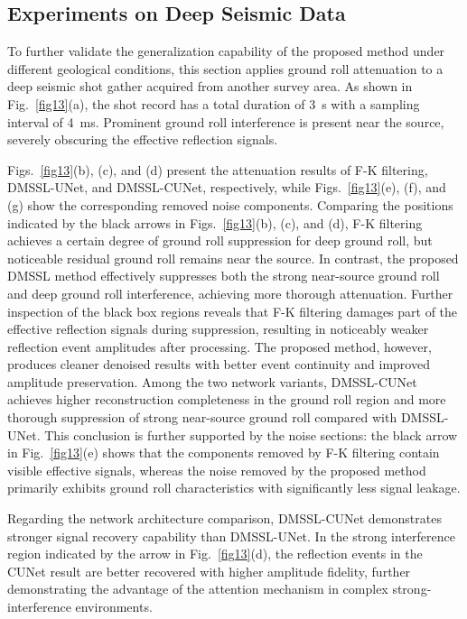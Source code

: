 \documentclass[a4paper,fleqn]{cas-dc}
\begin{document}
\subsection{Experiments on Deep Seismic Data}

To further validate the generalization capability of the proposed method under different 
geological conditions, this section applies ground roll attenuation to a deep seismic shot 
gather acquired from another survey area. As shown in Fig.~\ref{fig13}(a), the 
shot record has a total duration of 3~s with a sampling interval of 4~ms. Prominent ground 
roll interference is present near the source, severely obscuring the effective reflection 
signals.

Figs.~\ref{fig13}(b), (c), and (d) present the attenuation results of F-K 
filtering, DMSSL-UNet, and DMSSL-CUNet, respectively, while Figs.~\ref{fig13}(e), 
(f), and (g) show the corresponding removed noise components. Comparing the positions 
indicated by the black arrows in Figs.~\ref{fig13}(b), (c), and (d), F-K filtering 
achieves a certain degree of ground roll suppression for deep ground roll, but noticeable 
residual ground roll remains near the source. In contrast, the proposed DMSSL method 
effectively suppresses both the strong near-source ground roll and deep ground roll 
interference, achieving more thorough attenuation. Further inspection of the black box 
regions reveals that F-K filtering damages part of the effective reflection signals during 
suppression, resulting in noticeably weaker reflection event amplitudes after processing. 
The proposed method, however, produces cleaner denoised results with better event continuity 
and improved amplitude preservation. Among the two network variants, DMSSL-CUNet achieves 
higher reconstruction completeness in the ground roll region and more thorough suppression 
of strong near-source ground roll compared with DMSSL-UNet. This conclusion is further 
supported by the noise sections: the black arrow in Fig.~\ref{fig13}(e) shows that 
the components removed by F-K filtering contain visible effective signals, whereas the noise 
removed by the proposed method primarily exhibits ground roll characteristics with 
significantly less signal leakage.

Regarding the network architecture comparison, DMSSL-CUNet demonstrates stronger signal 
recovery capability than DMSSL-UNet. In the strong interference region indicated by the 
arrow in Fig.~\ref{fig13}(d), the reflection events in the CUNet result are better 
recovered with higher amplitude fidelity, further demonstrating the advantage of the 
attention mechanism in complex strong-interference environments.
\end{document}
